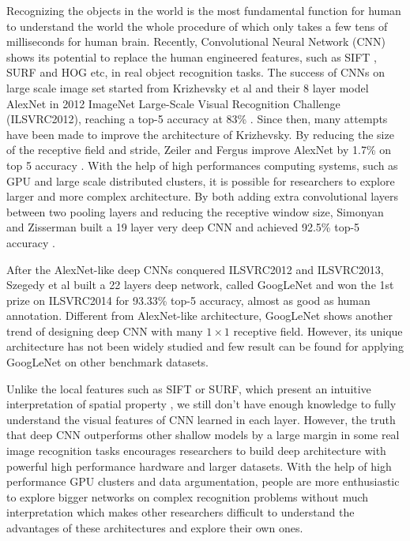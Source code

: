 ﻿Recognizing the objects in the world is the most fundamental function for human to understand the world the whole procedure of which only takes a few tens of milliseconds for human brain.
Recently, Convolutional Neural Network (CNN) shows its potential to replace the human engineered features, such as SIFT \cite{lowe1999object}, SURF \cite{bay2006surf} and HOG \cite{dalal2005histograms} etc, in real object recognition tasks. The success of CNNs on large scale image set started from Krizhevsky et al and their 8 layer model AlexNet in 2012 ImageNet Large-Scale Visual Recognition Challenge (ILSVRC2012), reaching a top-5 accuracy at 83\% \cite{krizhevsky2012imagenet}. Since then, many attempts have been made to improve the architecture of Krizhevsky.
By reducing the size of the receptive field and stride, Zeiler and Fergus improve AlexNet by 1.7\% on top 5 accuracy \cite{zeiler2014visualizing}. With the help of high performances computing systems, such as GPU and large scale distributed clusters, it is possible for researchers to explore larger and more complex architecture. By both adding extra convolutional layers between two pooling layers and reducing the receptive window size, Simonyan and Zisserman built a 19 layer very deep CNN and achieved 92.5\% top-5 accuracy \cite{simonyan2014very}. 

After the AlexNet-like deep CNNs conquered ILSVRC2012 and ILSVRC2013, Szegedy et al built a 22 layers deep network, called GoogLeNet and won the 1st prize on ILSVRC2014 for 93.33\% top-5 accuracy, almost as good as human annotation\cite{szegedy2014going}. Different from AlexNet-like architecture, GoogLeNet shows another trend of designing deep CNN with many $1\times 1$ receptive field. However, its unique architecture has not been widely studied and few result can be found for applying GoogLeNet on other benchmark datasets.

Unlike the local features such as SIFT or SURF, which present an intuitive interpretation of spatial property%
, we still don't have enough knowledge to fully understand the visual features of CNN learned in each layer. 
However, the truth that deep CNN outperforms other shallow models by a large margin in some real image recognition tasks encourages researchers to build deep architecture with powerful high performance hardware and larger datasets. With the help of high performance GPU clusters and data argumentation, people are more enthusiastic to explore bigger networks on complex recognition problems without much interpretation which makes other researchers difficult to understand the advantages of these architectures and explore their own ones.

